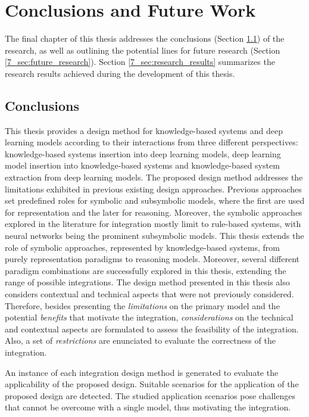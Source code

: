\chapter{Conclusions and Future Work}
\label{chap:conc}
The final chapter of this thesis addresses the conclusions (Section \ref{7_sec:conclusions}) of the research, as well as outlining the potential lines for future research (Section \ref{7_sec:future_research}). Section \ref{7_sec:research_results} summarizes the research results achieved during the development of this thesis.

\section{Conclusions}\label{7_sec:conclusions}
This thesis provides a design method for knowledge-based systems and deep learning models according to their interactions from three different perspectives: knowledge-based systems insertion into deep learning models, deep learning model insertion into knowledge-based systems and knowledge-based system extraction from deep learning models. The proposed design method addresses the limitations exhibited in previous existing design approaches. Previous approaches set predefined roles for symbolic and subsymbolic models, where the first are used for representation and the later for reasoning. Moreover, the symbolic approaches explored in the literature for integration mostly limit to rule-based systems, with neural networks being the prominent subsymbolic models. This thesis extends the role of symbolic approaches, represented by knowledge-based systems, from purely representation paradigms to reasoning models. Moreover, several different paradigm combinations are successfully explored in this thesis, extending the range of possible integrations. The design method presented in this thesis also considers contextual and technical aspects that were not previously considered. Therefore, besides presenting the \textit{limitations} on the primary model and the potential \textit{benefits} that motivate the integration, \textit{considerations} on the technical and contextual aspects are formulated to assess the feasibility of the integration. Also, a set of \textit{restrictions} are enunciated to evaluate the correctness of the integration. 

An instance of each integration design method is generated to evaluate the applicability of the proposed design. Suitable scenarios for the application of the proposed design are detected. The studied application scenarios pose challenges that cannot be overcome with a single model, thus motivating the integration. 

